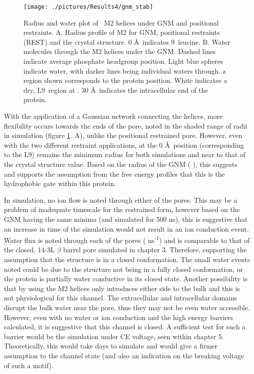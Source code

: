 \begin{figure}[H]
\begin{center}
\texttt{[image: ./pictures/Results4/gnm\_stab]}
\caption[Radius and water plot of \HT\ M2 helices under GNM and positional restraints.] {Radius and water plot of \HT\ M2 helices under GNM and positional restraints. A. Radius profile of M2 for GNM, positional restraints (REST) and the crystal structure. 0 \AA\ indicates 9\textquotesingle\ leucine. B. Water molecules through the M2 helices under the GNM. Dashed lines indicate average phosphate headgroup position. Light blue spheres indicate water, with darker lines being individual waters through. z region shown corresponds to the protein position. White indicates a dry, L9\textquotesingle\ region at  \angstrom. 30 \AA\ indicates the intracellular end of the protein.}
\label{fig:gnm_stab}
\end{center}
\end{figure}

With the application of a Gaussian network connecting the helices, more flexibility occurs towards the ends of the pore, noted in the shaded range of radii in simulation (figure \ref{fig:gnm_stab}. A), unlike the positional restrained pore. However, even with the two different restraint applications, at the 0 \AA\ position (corresponding to the L9\textquotesingle) remains the minimum radius for both simulations and near to that of the crystal structure value. Based on the radius of the GNM ( \angstrom), this suggests and supports the assumption from the free energy profiles that this is the hydrophobic gate within this protein.

In simulation, no ion flow is noted through either of the pores. This may be a problem of inadequate timescale for the restrained form, however based on the GNM having the same minima (and simulated for 500 ns), this is suggestive that an increase in time of the simulation would not result in an ion conduction event. Water flux is noted through each of the pores ( ns\textsuperscript{-1}) and is comparable to that of the closed, 14-3L $\beta$ barrel pore simulated in chapter 3. Therefore, supporting the assumption that the structure is in a closed conformation. The small water events noted could be due to the structure not being in a fully closed conformation, or the protein is partially water conductive in its closed state. Another possibility is that by using the M2 helices only introduces either side to the bulk and this is not physiological for this channel. The extracellular and intracellular domains disrupt the bulk water near the pore, thus they may not be even water accessible. However, even with  no water or ion conduction and the high energy barriers calculated, it is suggestive that this channel is closed. A sufficient test for such a barrier would be the simulation under CE voltage, seen within chapter 5. Theoretically, this would take  days to simulate and would give a firmer assumption to the channel state (and also an indication on the breaking voltage of such a motif).

